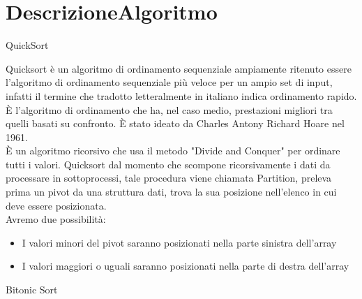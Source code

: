 \chapter{DescrizioneAlgoritmo}






\maketitle QuickSort

Quicksort è un algoritmo di ordinamento sequenziale ampiamente ritenuto essere l'algoritmo di ordinamento sequenziale più veloce per un ampio set di input, infatti il termine che tradotto letteralmente in italiano indica ordinamento rapido. È l'algoritmo di ordinamento che ha, nel caso medio, prestazioni migliori tra quelli basati su confronto. È stato ideato da Charles Antony Richard Hoare nel 1961.\\ 
È un algoritmo ricorsivo che usa il metodo "Divide and Conquer" per ordinare tutti i valori. Quicksort dal momento che scompone ricorsivamente i dati da processare in sottoprocessi, tale procedura viene chiamata Partition, preleva prima un pivot da una struttura dati, trova la sua posizione nell'elenco in cui deve essere posizionata. \\
Avremo due possibilità:
\begin{itemize}
\item I valori minori del pivot saranno posizionati nella parte sinistra dell'array
\item I valori maggiori o uguali saranno posizionati nella parte di destra dell'array
\end{itemize}




\maketitle Bitonic Sort



